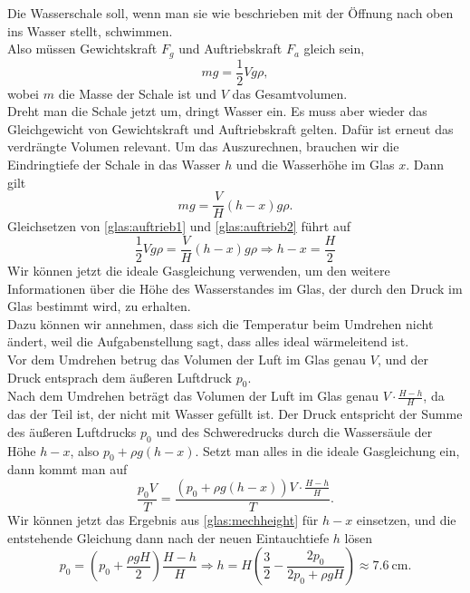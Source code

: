 \begin{Answer}[ref = glas]
	Die Wasserschale soll, wenn man sie wie beschrieben mit der Öffnung nach oben ins Wasser stellt, schwimmen.\\
	Also müssen Gewichtskraft $F_g$ und Auftriebskraft $F_a$ gleich sein,
	\begin{equation}\label{glas:auftrieb1}
		m g = \frac{1}{2}Vg\rho,
	\end{equation}
	wobei $m$ die Masse der Schale ist und $V$ das Gesamtvolumen.\\
	Dreht man die Schale jetzt um, dringt Wasser ein. Es muss aber wieder das Gleichgewicht von Gewichtskraft und Auftriebskraft gelten. Dafür ist erneut das verdrängte Volumen relevant. Um das Auszurechnen, brauchen wir die Eindringtiefe der Schale in das Wasser $h$ und die Wasserhöhe im Glas $x$. Dann gilt
	\begin{equation}\label{glas:auftrieb2}
		mg = \frac{V}{H}\left(h-x\right) g \rho.
	\end{equation}
	Gleichsetzen von \eqref{glas:auftrieb1} und \eqref{glas:auftrieb2} führt auf
	\begin{equation}\label{glas:mechheight}
		\frac{1}{2}Vg\rho = \frac{V}{H}\left(h-x\right) g \rho \Rightarrow h-x = \frac{H}{2}
	\end{equation}
	Wir können jetzt die ideale Gasgleichung verwenden, um den weitere Informationen über die Höhe des Wasserstandes im Glas, der durch den Druck im Glas bestimmt wird, zu erhalten.\\
	Dazu können wir annehmen, dass sich die Temperatur beim Umdrehen nicht ändert, weil die Aufgabenstellung sagt, dass alles ideal wärmeleitend ist.\\
	Vor dem Umdrehen betrug das Volumen der  Luft im Glas genau $V$, und der Druck entsprach dem äußeren Luftdruck $p_0$.\\
	Nach dem Umdrehen beträgt das Volumen der Luft im Glas genau $V \cdot \frac{H-h}{H}$, da das der Teil ist, der nicht mit Wasser gefüllt ist. Der Druck entspricht der Summe des äußeren Luftdrucks $p_0$ und des Schweredrucks durch die Wassersäule der Höhe $h-x$, also $p_0 + \rho g \left(h-x\right)$. Setzt man alles in die ideale Gasgleichung ein, dann kommt man auf
	\begin{equation}
		\frac{p_0 V}{T} = \frac{\left(p_0 + \rho g \left(h-x\right) \right) V \cdot \frac{H-h}{H}}{T}.
	\end{equation}
	Wir können jetzt das Ergebnis aus \eqref{glas:mechheight} für $h-x$ einsetzen, und die entstehende Gleichung dann nach der neuen Eintauchtiefe $h$ lösen
	\begin{equation}\boxed{
		p_0= \left(p_0 + \frac{\rho g H}{2}\right) \frac{H-h}{H} \Rightarrow h = H \left(\frac{3}{2} - \frac{2p_0}{2p_0 + \rho g H}\right) \approx 7.6~\mathrm{cm}.}
	\end{equation}
\end{Answer}